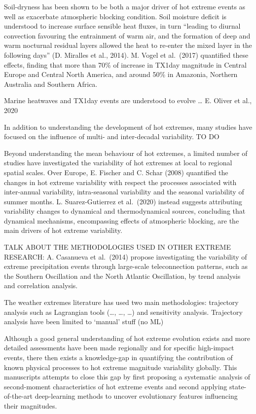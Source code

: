 \documentclass[11pt,a4paper,twoside,openright]{report}
\theoremstyle{definition}
\numberwithin{equation}{subsection}
\begin{document}
Soil-dryness has been shown to be both a major driver of hot extreme events as well as exacerbate atmospheric blocking condition. Soil moisture deficit is understood to increase surface sensible heat fluxes, in turn ``leading to diurnal convection favouring the entrainment of warm air, and the formation of deep and warm nocturnal residual layers allowed the heat to re-enter the mixed layer in the following days'' (D. Miralles et al., 2014). M. Vogel et al.~(2017) quantified these effects, finding that more than 70\% of increase in TX1day magnitude in Central Europe and Central North America, and around 50\% in Amazonia, Northern Australia and Southern Africa.

Marine heatwaves and TX1day events are understood to evolve \ldots{} E. Oliver et al., 2020

In addition to understanding the development of hot extremes, many studies have focused on the influence of multi- and inter-decadal variability. TO DO

Beyond understanding the mean behaviour of hot extremes, a limited number of studies have investigated the variability of hot extremes at local to regional spatial scales. Over Europe, E. Fischer and C. Schar (2008) quantified the changes in hot extreme variability with respect the processes associated with inter-annual variability, intra-seasonal variability and the seasonal variability of summer months. L. Suarez-Gutierrez et al.~(2020) instead suggests attributing variability changes to dynamical and thermodynamical sources, concluding that dynamical mechanisms, encompassing effects of atmospheric blocking, are the main drivers of hot extreme variability.

TALK ABOUT THE METHODOLOGIES USED IN OTHER EXTREME RESEARCH:
A. Casanueva et al.~(2014) propose investigating the variability of extreme precipitation events through large-scale teleconnection patterns, such as the Southern Oscillation and the North Atlantic Oscillation, by trend analysis and correlation analysis.

The weather extremes literature has used two main methodologies: trajectory analysis such as Lagrangian tools (\ldots, \ldots, \ldots) and sensitivity analysis. Trajectory analysis have been limited to `manual' stuff (no ML)

Although a good general understanding of hot extreme evolution exists and more detailed assessments have been made regionally and for specific high-impact events, there then exists a knowledge-gap in quantifying the contribution of known physical processes to hot extreme magnitude variability globally. This manuscripts attempts to close this gap by first proposing a systematic analysis of second-moment characteristics of hot extreme events and second applying state-of-the-art deep-learning methods to uncover evolutionary features influencing their magnitudes.
\end{document}
